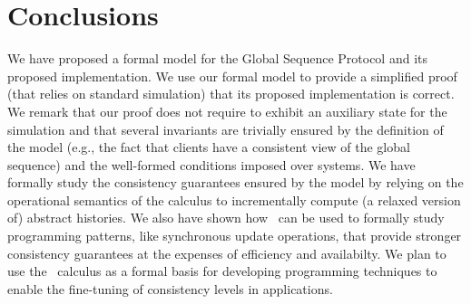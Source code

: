 
\section{Conclusions}
We have proposed a formal model for 
the Global Sequence Protocol and its proposed implementation. We use our formal model 
to provide  a 
simplified proof (that relies on standard  simulation) that its proposed implementation is 
correct. 
We remark that our proof does not require to exhibit an auxiliary state for the simulation  and 
that several 
invariants are trivially ensured by the definition of the model (e.g., the fact that clients have
a consistent view of the global sequence) and the well-formed conditions imposed over systems.  
We have formally study the consistency guarantees ensured by the model by relying on the 
 operational semantics of the calculus to incrementally compute (a relaxed version of) 
abstract histories. We also have shown how  \gsp\ can be used to formally study programming patterns, 
like synchronous update operations, that provide stronger consistency guarantees at the expenses of efficiency 
and availabilty. We plan to use the \gsp\ calculus as a formal basis for 
developing programming techniques to enable the fine-tuning of consistency levels 
in applications. 
